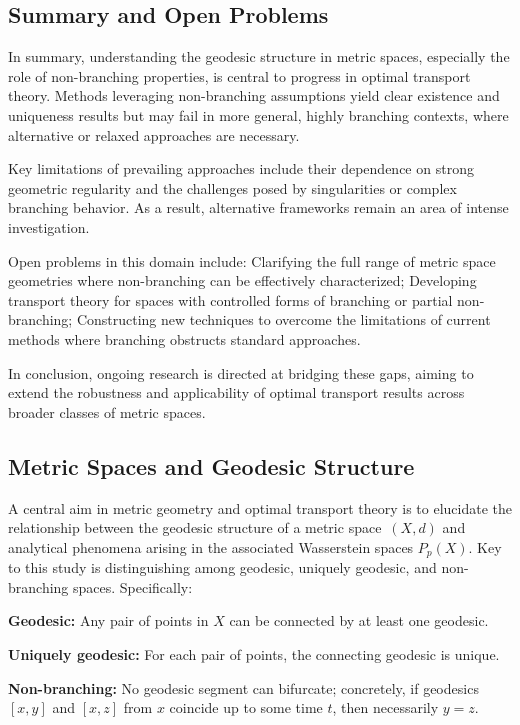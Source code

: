\documentclass[sigconf]{acmart}
\begin{document}
\subsection*{Summary and Open Problems}

In summary, understanding the geodesic structure in metric spaces, especially the role of non-branching properties, is central to progress in optimal transport theory. Methods leveraging non-branching assumptions yield clear existence and uniqueness results but may fail in more general, highly branching contexts, where alternative or relaxed approaches are necessary.

Key limitations of prevailing approaches include their dependence on strong geometric regularity and the challenges posed by singularities or complex branching behavior. As a result, alternative frameworks remain an area of intense investigation.

Open problems in this domain include:
Clarifying the full range of metric space geometries where non-branching can be effectively characterized;
Developing transport theory for spaces with controlled forms of branching or partial non-branching;
Constructing new techniques to overcome the limitations of current methods where branching obstructs standard approaches.

In conclusion, ongoing research is directed at bridging these gaps, aiming to extend the robustness and applicability of optimal transport results across broader classes of metric spaces.

\subsection{Metric Spaces and Geodesic Structure}

A central aim in metric geometry and optimal transport theory is to elucidate the relationship between the geodesic structure of a metric space~$(X, d)$ and analytical phenomena arising in the associated Wasserstein spaces $P_p(X)$. Key to this study is distinguishing among geodesic, uniquely geodesic, and non-branching spaces. Specifically:

\textbf{Geodesic:} Any pair of points in $X$ can be connected by at least one geodesic.

\textbf{Uniquely geodesic:} For each pair of points, the connecting geodesic is unique.

\textbf{Non-branching:} No geodesic segment can bifurcate; concretely, if geodesics $[x, y]$ and $[x, z]$ from $x$ coincide up to some time $t$, then necessarily $y = z$.
\end{document}
